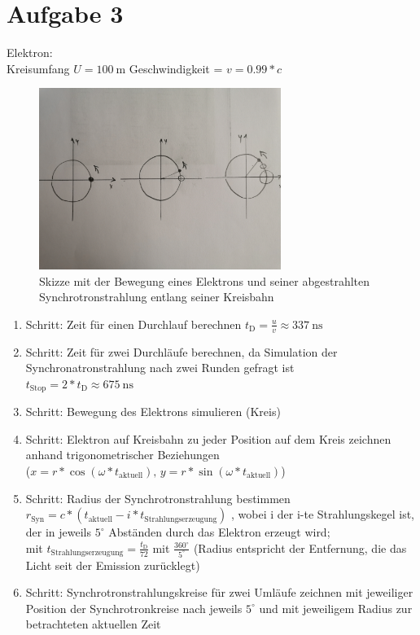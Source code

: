 \documentclass[11pt,a4paper]{article}
\begin{document}
    \section*{Aufgabe 3}
        Elektron: \\
            Kreisumfang \(U = \SI{100}{\metre}\)
            Geschwindigkeit = \( v = 0.99*c \)
        \begin{figure}[h]
            \centering
            \includegraphics[width=0.7\textwidth]{images/Synchrotron_Skizze.jpg}
            \caption{Skizze mit der Bewegung eines Elektrons und seiner abgestrahlten Synchrotronstrahlung entlang seiner Kreisbahn}
        \end{figure}
        \begin{enumerate}
            \item Schritt: Zeit für einen Durchlauf berechnen \( t_{\mathrm{D}} = \frac{u}{v} \approx \SI{337}{\nano\second}\) 
            \item Schritt: Zeit für zwei Durchläufe berechnen, da Simulation der Synchronatronstrahlung nach zwei Runden gefragt ist \\
            \( t_{\mathrm{Stop}} = 2*t_{\mathrm{D}} \approx \SI{675}{\nano\second}\) 
            \item Schritt: Bewegung des Elektrons simulieren (Kreis)
            \item Schritt: Elektron auf Kreisbahn zu jeder Position auf dem Kreis zeichnen anhand trigonometrischer Beziehungen \\
            (\( x = r * \cos(\omega * t_{ \mathrm{aktuell} } ) , \, y = r * \sin(\omega * t_{ \mathrm{aktuell} } ) \))
            \item Schritt: Radius der Synchrotronstrahlung bestimmen \\
            \( r_{\mathrm{Syn}} = c*(t_{ \mathrm{aktuell} } - i * t_{ \mathrm{Strahlungserzeugung} } ) \) , 
            wobei i der i-te Strahlungskegel ist, der in jeweils \( 5 ^\circ\) Abständen durch das Elektron erzeugt wird; \\
            mit \( t_{\mathrm{Strahlungserzeugung}} = \frac{t_{\mathrm{D}}}{72} \) mit \( \frac{360 ^\circ}{5 ^\circ} \) 
            (Radius entspricht der Entfernung, die das Licht seit der Emission zurücklegt)
            \item Schritt: Synchrotronstrahlungskreise für zwei Umläufe zeichnen mit jeweiliger Position der Synchrotronkreise 
            nach jeweils \( 5 ^\circ\) und mit jeweiligem Radius zur betrachteten aktuellen Zeit 
        \end{enumerate}
\end{document}
